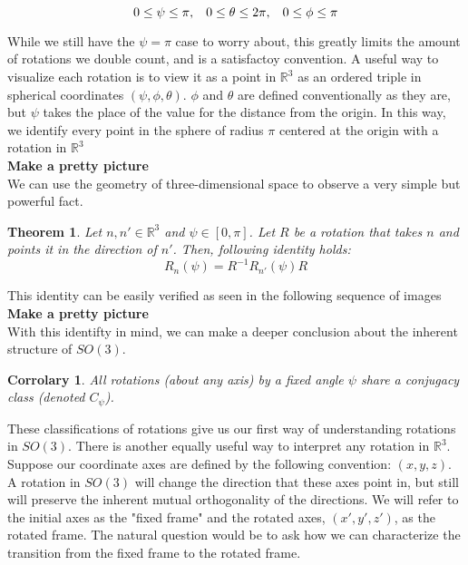 \documentclass[10pt]{ucthesis}
\newcommand{\R}{\mathbb{R}}
\newtheorem{theorem}[definition]{Theorem}
\newtheorem{corrolary}[definition]{Corrolary}
\begin{document}
$$0\leq\psi\leq\pi, \hspace{3mm} 0\leq\theta\leq2\pi, \hspace{3mm} 0\leq\phi\leq\pi$$

While we still have the $\psi=\pi$ case to worry about, this greatly limits the amount of rotations we double count, and is a satisfactoy convention. A useful way to visualize each rotation is to view it as a point in $\R^3$ as an ordered triple in spherical coordinates $(\psi,\phi,\theta)$. $\phi$ and $\theta$ are defined conventionally as they are, but $\psi$ takes the place of the value for the distance from the origin. In this way, we identify every point in the sphere of radius $\pi$ centered at the origin with a rotation in $\R^3$ \\

\textbf{Make a pretty picture} \\

We can use the geometry of three-dimensional space to observe a very simple but powerful fact.

\begin{theorem}
	Let $n, n'\in\R^3$ and $\psi\in[0,\pi]$. Let $R$ be a rotation that takes $n$ and points it in the direction of $n'$. Then, following identity holds:
$$R_{n}(\psi) = R^{-1}R_{n'}(\psi)R$$
\end{theorem}

This identity can be easily verified as seen in the following sequence of images\\

\textbf{Make a pretty picture}\\

With this identifty in mind, we can make a deeper conclusion about the inherent structure of $SO(3)$.

\begin{corrolary}
	All rotations (about any axis) by a fixed angle $\psi$ share a conjugacy class (denoted $C_\psi$).
\end{corrolary}

These classifications of rotations give us our first way of understanding rotations in $SO(3)$. There is another equally useful way to interpret any rotation in $\R^3$. Suppose our coordinate axes are defined by the following convention: $(x,y,z)$. A rotation in $SO(3)$ will change the direction that these axes point in, but still will preserve the inherent mutual orthogonality of the directions. We will refer to the initial axes as the "fixed frame" and the rotated axes, $(x',y',z')$, as the rotated frame. The natural question would be to ask how we can characterize the transition from the fixed frame to the rotated frame.
\end{document}
